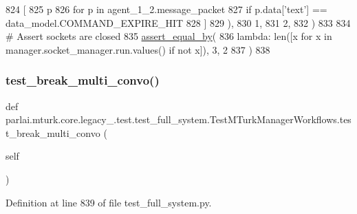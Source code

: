\begin{DoxyCode}
824                 [
825                     p
826                     \textcolor{keywordflow}{for} p \textcolor{keywordflow}{in} agent\_1\_2.message\_packet
827                     \textcolor{keywordflow}{if} p.data[\textcolor{stringliteral}{'text'}] == data\_model.COMMAND\_EXPIRE\_HIT
828                 ]
829             ),
830             1,
831             2,
832         )
833 
834         \textcolor{comment}{# Assert sockets are closed}
835         \hyperlink{namespaceparlai_1_1mturk_1_1core_1_1test_1_1test__full__system_a0b463246d35658a2e422010f13dcf819}{assert\_equal\_by}(
836             \textcolor{keyword}{lambda}: len([x \textcolor{keywordflow}{for} x \textcolor{keywordflow}{in} manager.socket\_manager.run.values() \textcolor{keywordflow}{if} \textcolor{keywordflow}{not} x]), 3, 2
837         )
838 
\end{DoxyCode}
\mbox{\label{classparlai_1_1mturk_1_1core_1_1legacy__2018_1_1test_1_1test__full__system_1_1TestMTurkManagerWorkflows_a7bb327cdbf5f8266b384e619fbe28cd9}} 
\subsubsection{\texorpdfstring{test\+\_\+break\+\_\+multi\+\_\+convo()}{test\_break\_multi\_convo()}}
{\footnotesize\ttfamily def parlai.\+mturk.\+core.\+legacy\+\_.\+test.\+test\+\_\+full\+\_\+system.\+Test\+M\+Turk\+Manager\+Workflows.\+test\+\_\+break\+\_\+multi\+\_\+convo (\begin{DoxyParamCaption}\item[{}]{self }\end{DoxyParamCaption})}



Definition at line 839 of file test\+\_\+full\+\_\+system.\+py.


